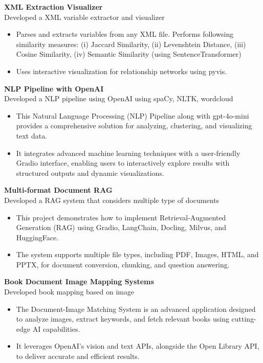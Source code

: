 \documentclass[10pt,a4paper]{article}
\begin{document}
	\textbf{XML Extraction Visualizer} \hfill \textit{}\\
Developed a XML variable extractor and visualizer 
\begin{itemize}[leftmargin=0.2in]
	\item Parses and extracts variables from any XML file. Performs followsing similarity measures: (i) Jaccard Similarity, (ii) Levenshtein Distance, (iii) 	Cosine Similarity, (iv) Semantic Similarity (using SentenceTransformer)

	\item Uses interactive visualization for relationship networks using pyvis.
	
\end{itemize}
	
	\textbf{NLP Pipeline with OpenAI} \hfill \textit{}\\
 Developed a NLP pipeline using OpenAI using spaCy, NLTK, wordcloud 
\begin{itemize}[leftmargin=0.2in]
	\item This Natural Language Processing (NLP) Pipeline along with gpt-4o-mini provides a comprehensive solution for analyzing, clustering, and visualizing text data. 
	\item It integrates advanced machine learning techniques with a user-friendly Gradio interface, enabling users to interactively explore results with structured outputs and dynamic visualizations.
\end{itemize}

	\textbf{Multi-format Document RAG} \hfill \textit{}\\
Developed a RAG system that considers multiple type of documents 
\begin{itemize}[leftmargin=0.2in]
	\item This project demonstrates how to implement Retrieval-Augmented Generation (RAG) using Gradio, LangChain, Docling, Milvus, and HuggingFace. 
	\item The system supports multiple file types, including PDF, Images, HTML, and PPTX, for document conversion, chunking, and question answering.
\end{itemize}

	\textbf{Book Document Image Mapping Systems} \hfill \textit{}\\
  Developed book mapping based on image 
\begin{itemize}[leftmargin=0.2in]
	\item The Document-Image Matching System is an advanced application designed to analyze images, extract keywords, and fetch relevant books using cutting-edge AI capabilities. 
	\item It leverages OpenAI's vision and text APIs, alongside the Open Library API, to deliver accurate and efficient results.
	
\end{itemize}
\end{document}
